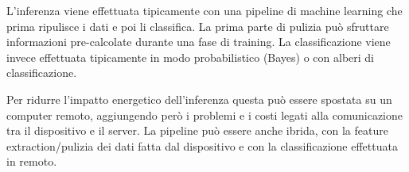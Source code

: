 L'inferenza viene effettuata tipicamente con una pipeline di machine
learning che prima ripulisce i dati e poi li classifica. La prima parte
di pulizia può sfruttare informazioni pre-calcolate durante una fase di
training. La classificazione viene invece effettuata tipicamente in modo
probabilistico (Bayes) o con alberi di classificazione.

Per ridurre l'impatto energetico dell'inferenza questa può essere
spostata su un computer remoto, aggiungendo però i problemi e i costi
legati alla comunicazione tra il dispositivo e il server. La pipeline
può essere anche ibrida, con la feature extraction/pulizia dei dati
fatta dal dispositivo e con la classificazione effettuata in remoto.
